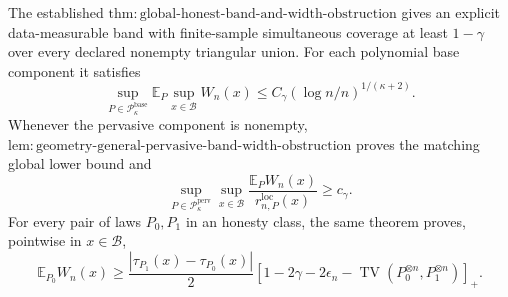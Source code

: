 The established \(\mathrm{thm:global\text{-}honest\text{-}band\text{-}and\text{-}width\text{-}obstruction}\) gives an explicit data-measurable band with finite-sample simultaneous coverage at least \(1-\gamma\) over every declared nonempty triangular union. For each polynomial base component it satisfies
\[
 \sup_{P\in\mathcal P_{\kappa}^{\mathrm{base}}}
 \mathbb E_P\sup_{x\in\mathcal B}W_n(x)
 \le C_\gamma(\log n/n)^{1/(\kappa+2)}.
\]
Whenever the pervasive component is nonempty, \(\mathrm{lem:geometry\text{-}general\text{-}pervasive\text{-}band\text{-}width\text{-}obstruction}\) proves the matching global lower bound and
\[
 \sup_{P\in\mathcal P_{\kappa}^{\mathrm{perv}}}\sup_{x\in\mathcal B}
 \frac{\mathbb E_PW_n(x)}{r_{n,P}^{\mathrm{loc}}(x)}\ge c_\gamma.
\]
For every pair of laws \(P_0,P_1\) in an honesty class, the same theorem proves, pointwise in \(x\in\mathcal B\),
\[
 \mathbb E_{P_0}W_n(x)\ge
 \frac{|\tau_{P_1}(x)-\tau_{P_0}(x)|}{2}
 \left[1-2\gamma-2\epsilon_n-
 \operatorname{TV}(P_0^{\otimes n},P_1^{\otimes n})\right]_+.
\]